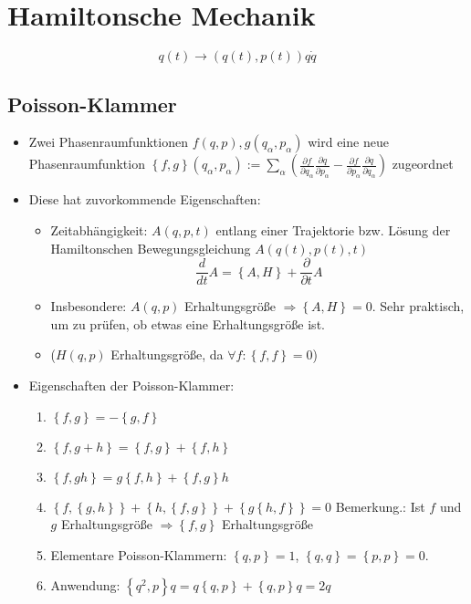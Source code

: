 \section{Hamiltonsche Mechanik}

$$
q(t) \rightarrow (q(t), p(t))
q\dot{q} 
$$

\subsection{Poisson-Klammer}
\begin{itemize}
\item Zwei Phasenraumfunktionen $f(q,p), g(q_\alpha,p_\alpha)$ wird
  eine neue Phasenraumfunktion
  $\left\{ f,g \right\}(q_\alpha,p_\alpha) := \sum\limits_\alpha
  \left( \frac{\partial f}{\partial q_\alpha}\frac{\partial
      q}{\partial p_\alpha} - \frac{\partial f}{\partial
      p_\alpha}\frac{\partial q}{\partial q_\alpha} \right)$
  zugeordnet

\item Diese hat zuvorkommende Eigenschaften:
\begin{itemize}
\item Zeitabhängigkeit: $A(q,p,t)$ entlang einer Trajektorie
  bzw. Lösung der Hamiltonschen Bewegungsgleichung $A(q(t),p(t),t)$
$$\frac{d}{dt} A = \left\{ A,H \right\} + \frac{\partial}{\partial t}A$$
\item Insbesondere: $A(q,p)$ Erhaltungsgröße
  $\Rightarrow \left\{ A,H \right\}=0$.  Sehr praktisch, um zu prüfen,
  ob etwas eine Erhaltungsgröße ist.

\item ($H(q,p)$ Erhaltungsgröße, da
  $\forall f:\left\{ f,f \right\}=0$)
\end{itemize}

\item Eigenschaften der Poisson-Klammer:
  \begin{enumerate}
  \item\label{item:1} $\left\{ f,g \right\}=-\left\{ g,f \right\}$
  \item\label{item:2}
    $\left\{ f,g+h \right\}=\left\{ f,g \right\}+\left\{ f,h \right\}$
  \item\label{item:3}
    $\left\{ f,gh \right\}=g\left\{ f,h \right\} + \left\{ f,g
    \right\}h$
  \item\label{item:4}
    $\left\{ f,\left\{ g,h \right\} \right\} + \left\{ h ,\left\{f,g
      \right\} \right\} + \left\{ g\left\{ h,f \right\} \right\} = 0$
    Bemerkung.: Ist $f$ und $g$ Erhaltungsgröße
    $\Rightarrow \left\{ f,g \right\}$ Erhaltungsgröße
  \item\label{item:5} Elementare Poisson-Klammern:
    $\left\{ q,p \right\} = 1$,
    $\left\{ q,q \right\}=\left\{ p,p \right\}=0$.

  \item\label{item:6} Anwendung:
    $\left\{ q^2,p \right\}q = q \left\{ q,p \right\} + \left\{ q,p
    \right\}q = 2q$
  \end{enumerate}

\end{itemize}


